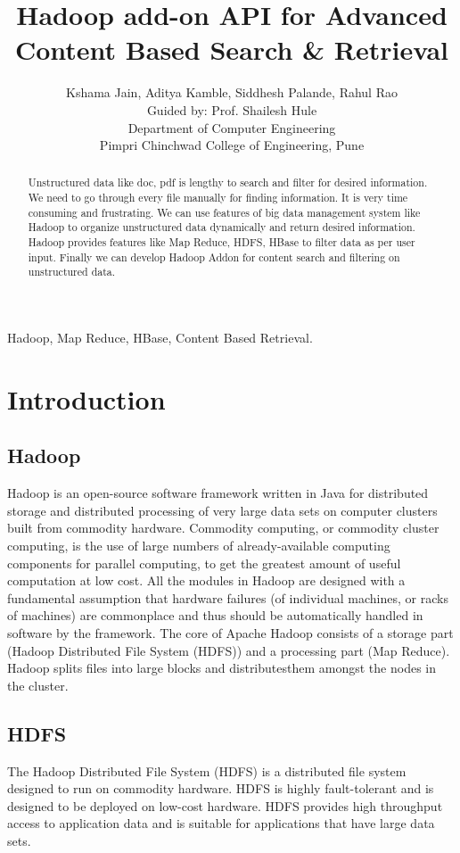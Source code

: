 \documentclass{IEEEtran}
\title{Hadoop add-on API for Advanced Content Based Search \& Retrieval}
\author{Kshama Jain, Aditya Kamble, Siddhesh Palande, Rahul Rao\\ Guided by: Prof. Shailesh Hule\\ Department of Computer Engineering\\ Pimpri Chinchwad College of Engineering, Pune}
\begin{document}
\maketitle

\begin{abstract}
Unstructured data like doc, pdf is lengthy to search and filter for desired information. We need to go through every file manually for finding information. It is very time consuming and frustrating. We can use features of big data management system like Hadoop to organize unstructured data dynamically and return desired information. Hadoop provides features like Map Reduce, HDFS, HBase to filter data as per user input. Finally we can develop Hadoop Addon for content search and filtering on unstructured data.
\end{abstract}

\begin{IEEEkeywords}
Hadoop, Map Reduce, HBase, Content Based Retrieval.
\end{IEEEkeywords}

\section{Introduction}
\subsection{Hadoop}
Hadoop is an open-source software framework written in Java for distributed storage and distributed processing of very large data sets on computer clusters built from commodity hardware. Commodity computing, or commodity cluster computing, is the use of large numbers of already-available computing components for parallel computing, to get the greatest amount of useful computation at low cost. All the modules in Hadoop are designed with a fundamental assumption that hardware failures (of individual machines, or racks of machines) are commonplace and thus should be automatically handled in software by the framework. The core of Apache Hadoop consists of a storage part (Hadoop Distributed File System (HDFS)) and a processing part (Map Reduce). Hadoop splits files into large blocks and distributesthem amongst the nodes in the cluster.

\subsection{HDFS}
The Hadoop Distributed File System (HDFS) is a distributed file system designed to run on commodity hardware. HDFS is highly fault-tolerant and is designed to be deployed on low-cost hardware. HDFS provides high throughput access to application data and is suitable for applications that have large data sets.
\end{document}
